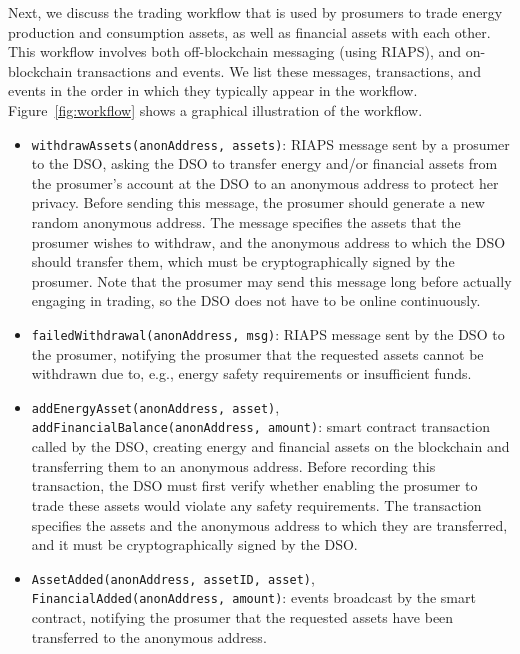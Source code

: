 Next, we discuss the trading workflow that is used by prosumers to trade energy production and consumption assets, as well as financial assets with each other.
This workflow involves both off-blockchain messaging (using RIAPS), and on-blockchain transactions and events.
We list these messages, transactions, and events in the order in which they typically appear in the workflow.
Figure~\ref{fig:workflow} shows a graphical illustration of the workflow.
\vspace{-0.1em}
\begin{itemize}[leftmargin=*]
\setlength{\itemsep}{0pt}%
    \setlength{\topsep}{0pt} 
    \setlength{\partopsep}{0pt}
    \setlength{\parsep}{0pt}
    \setlength{\parskip}{0pt}%
\item 
\texttt{withdrawAssets(anonAddress, assets)}: RIAPS message sent by a prosumer to the DSO, asking the DSO to transfer energy and/or financial assets from the prosumer's account at the DSO to an anonymous address to protect her privacy.
Before sending this message, the prosumer should generate a new random anonymous address.
The message specifies the assets that the prosumer wishes to withdraw, and the anonymous address to which the DSO should transfer them, which must be cryptographically signed by the prosumer.
Note that the prosumer may send this message long before actually engaging in trading, so the DSO does not have to be online continuously.
\item \texttt{failedWithdrawal(anonAddress, msg)}: RIAPS message sent by the DSO to the prosumer,
notifying the prosumer that the requested assets cannot be withdrawn due to, e.g., energy safety requirements or insufficient funds.
\item \texttt{addEnergyAsset(anonAddress, asset)},\\\texttt{addFinancialBalance(anonAddress, amount)}:
smart contract transaction called by the DSO, creating energy and financial assets on the blockchain and transferring them to an anonymous address.
Before recording this transaction, the DSO must first verify whether enabling the prosumer to trade these assets would violate any safety requirements.
The transaction specifies the assets and the anonymous address to which they are transferred, and it must be cryptographically signed by the DSO.
\item \texttt{AssetAdded(anonAddress, assetID, asset)},\\\texttt{FinancialAdded(anonAddress, amount)}: events broadcast by the smart contract,
notifying the prosumer that the requested assets have been transferred to the anonymous address.

\end{itemize}
